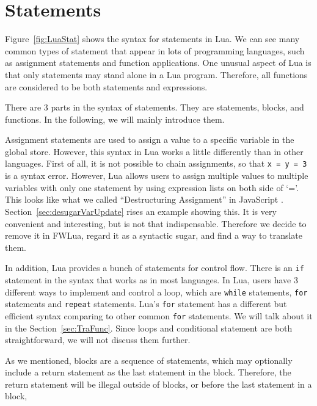 \section{Statements}
Figure~\ref{fig:LuaStat} shows the syntax for statements in Lua. We can see many common types of statement that appear in lots of programming languages, such as assignment statements and function applications. One unusual aspect of Lua is that only statements may stand alone in a Lua program.
Therefore, all functions are considered to be both statements and expressions.

There are 3 parts in the syntax of statements. They are statements, blocks, and functions. In the following, we will mainly introduce them.

Assignment statements are used to assign a value to a specific variable in the global store.
However, this syntax in Lua works a little differently than in other languages.
First of all, it is not possible to chain assignments, so that {\tt x = y = 3} is a syntax error.
However, Lua allows users to assign multiple values to multiple variables with only one statement by using expression lists on both side of `='. 
This looks like what we called ``Destructuring Assignment'' in JavaScript \cite{DA}. 
Section~\ref{sec:desugarVarUpdate} rises an example showing this. It is very convenient and interesting, but is not that indispensable. Therefore we decide to remove it in FWLua, regard it as a syntactic sugar, and find a way to translate them.

In addition, Lua provides a bunch of statements for control flow. There is an {\tt if} statement in the syntax that works as in most languages. In Lua, users have 3 different ways to implement and control a loop, which are {\tt while} statements, {\tt for} statements and {\tt repeat} statements. Lua's {\tt for} statement has a different but efficient syntax comparing to other common {\tt for} statements. We will talk about it in the Section~\ref{sec:TraFunc}.
Since loops and conditional statement are both straightforward, we will not discuss them further.

As we mentioned, blocks are a sequence of statements, which may optionally include a return statement as the last statement in the block. Therefore, the return statement will be illegal outside of blocks, or before the last statement in a block,

\newcommand{\assign}[2]{{\overline{#1_i}}~{=}~{\overline{#2_j}}}
\newcommand{\doe}[1]{\mbox{\tt do}~#1~{\tt end}}
\newcommand{\ife}[3]{\mbox{\tt if}~{#1}~\mbox{\tt then}~{#2}~\mbox{\tt else}~{#3}~{\tt end}}
\newcommand{\whilee}[2]{\mbox{\tt while}~#1~{\tt do}~#2~{\tt end}}
\newcommand{\repeate}[2]{\mbox{\tt repeat}~#2~{\tt until}~#1~}
\newcommand{\for}[3]{\mbox{\tt for}~#1~=~#2_1,~#2_2,~#2_3~{\tt do}~#3~{\tt end}}
\newcommand{\function}[3]{\mbox{\tt function}~#1({\overline{#2_i}})~#3~{\tt end}}
\newcommand{\local}[2]{\mbox{\tt local}~{\assign #1 #2}}


